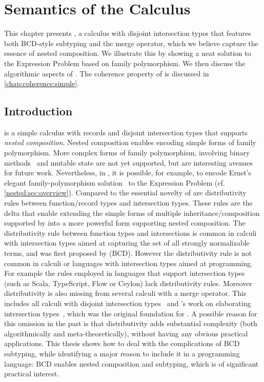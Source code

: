 
\chapter{Semantics of the \namee Calculus}
\label{chap:nested}

This chapter presents \namee, a calculus with disjoint intersection types that
features both BCD-style subtyping and the merge operator, which we believe
capture the essence of nested composition. We illustrate this by showing a neat
solution to the Expression Problem based on family polymorphism. We then discuss
the algorithmic aspects of \namee. The coherence property of \namee is discussed
in \cref{chap:coherence:simple}.

\section{Introduction}

\namee is a simple calculus with records and disjoint intersection types that
supports \emph{nested composition}. Nested composition enables encoding simple
forms of family polymorphism. More complex forms of family polymorphism,
involving binary methods~\citep{bruce1995binary} and mutable state are not yet
supported, but are interesting avenues for future work. Nevertheless, in \namee,
it is possible, for example, to encode Ernst's elegant family-polymorphism
solution~\citep{Ernst_2001} to the Expression Problem (cf.
\cref{nested:sec:overview}). Compared to \oname the essential novelty of
\namee are distributivity rules between function/record types and intersection
types. These rules are the delta that enable extending the simple forms of
multiple inheritance/composition supported by \oname into a more powerful form
supporting nested composition. The distributivity rule between function types
and intersections is common in calculi with intersection types aimed at
capturing the set of all strongly normalizable terms, and was first proposed by
\citet{Barendregt_1983} (BCD). However the distributivity rule is not common in
calculi or languages with intersection types aimed at programming. For example
the rules employed in languages that support intersection types (such as Scala,
TypeScript, Flow or Ceylon) lack distributivity rules. Moreover distributivity
is also missing from several calculi with a merge operator. This includes all
calculi with disjoint intersection types~\citep{oliveira2016disjoint,
  alpuimdisjoint} and \citeauthor{dunfield2014elaborating}'s work on elaborating
intersection types~\citep{dunfield2014elaborating}, which was the original
foundation for \oname. A possible reason for this omission in the past is that
distributivity adds substantial complexity (both algorithmically and
meta-theoretically), without having any obvious practical applications. This
thesis shows how to deal with the complications of BCD subtyping, while
identifying a major reason to include it in a programming language: BCD enables
nested composition and subtyping, which is of significant practical interest.

